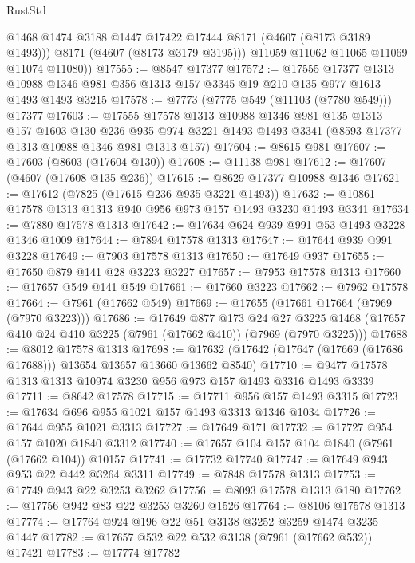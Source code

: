 \begin{lexlean}{RustStd}
\begin{coremodule}
            @1468
            @1474
            @3188
            @1447
            @17422
            @17444
            @8171
            (@4607 (@8173 @3189 @1493)))
          @8171
          (@4607 (@8173 @3179 @3195)))
        @11059
        @11062
        @11065
        @11069
        @11074
        @11080))
@17555 := @8547 @17377
@17572 := @17555
    @17377
    @1313
    @10988
    @1346
    @981
    @356
    @1313
    @157
    @3345
    @19
    @210
    @135
    @977
    @1613
    @1493
    @1493
    @3215
@17578 := @7773 (@7775 @549 (@11103 (@7780 @549))) @17377
@17603 := @17555
    @17578
    @1313
    @10988
    @1346
    @981
    @135
    @1313
    @157
    @1603
    @130
    @236
    @935
    @974
    @3221
    @1493
    @1493
    @3341
    (@8593 @17377 @1313 @10988 @1346 @981 @1313 @157)
@17604 := @8615 @981
@17607 := @17603 (@8603 (@17604 @130))
@17608 := @11138 @981
@17612 := @17607 (@4607 (@17608 @135 @236))
@17615 := @8629 @17377 @10988 @1346
@17621 := @17612 (@7825 (@17615 @236 @935 @3221 @1493))
@17632 := @10861 @17578 @1313 @1313 @940 @956 @973 @157 @1493 @3230 @1493 @3341
@17634 := @7880 @17578 @1313
@17642 := @17634 @624 @939 @991 @53 @1493 @3228 @1346 @1009
@17644 := @7894 @17578 @1313
@17647 := @17644 @939 @991 @3228
@17649 := @7903 @17578 @1313
@17650 := @17649 @937
@17655 := @17650 @879 @141 @28 @3223 @3227
@17657 := @7953 @17578 @1313
@17660 := @17657 @549 @141 @549
@17661 := @17660 @3223
@17662 := @7962 @17578
@17664 := @7961 (@17662 @549)
@17669 := @17655 (@17661 @17664 (@7969 (@7970 @3223)))
@17686 := @17649
    @877
    @173
    @24
    @27
    @3225
    @1468
    (@17657 @410 @24 @410 @3225 (@7961 (@17662 @410)) (@7969 (@7970 @3225)))
@17688 := @8012 @17578 @1313
@17698 := @17632 (@17642 (@17647 (@17669 (@17686 @17688))) @13654 @13657 @13660 @13662 @8540)
@17710 := @9477 @17578 @1313 @1313 @10974 @3230 @956 @973 @157 @1493 @3316 @1493 @3339
@17711 := @8642 @17578
@17715 := @17711 @956 @157 @1493 @3315
@17723 := @17634 @696 @955 @1021 @157 @1493 @3313 @1346 @1034
@17726 := @17644 @955 @1021 @3313
@17727 := @17649 @171
@17732 := @17727 @954 @157 @1020 @1840 @3312
@17740 := @17657 @104 @157 @104 @1840 (@7961 (@17662 @104)) @10157
@17741 := @17732 @17740
@17747 := @17649 @943 @953 @22 @442 @3264 @3311
@17749 := @7848 @17578 @1313
@17753 := @17749 @943 @22 @3253 @3262
@17756 := @8093 @17578 @1313 @180
@17762 := @17756 @942 @83 @22 @3253 @3260 @1526
@17764 := @8106 @17578 @1313
@17774 := @17764 @924 @196 @22 @51 @3138 @3252 @3259 @1474 @3235 @1447
@17782 := @17657 @532 @22 @532 @3138 (@7961 (@17662 @532)) @17421
@17783 := @17774 @17782

\end{coremodule}
\end{lexlean}
